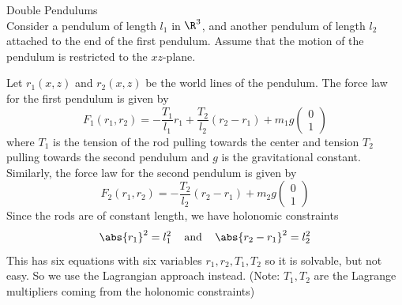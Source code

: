 \documentclass[a4paper]{article}
\begin{document}
\begin{eg}{Double Pendulums}{}\\
Consider a pendulum of length $l_1$ in $\R^3$, and another pendulum of length $l_2$ attached to the end of the first pendulum. Assume that the motion of the pendulum is restricted to the $xz$-plane. 

Let $r_1(x,z)$ and $r_2(x,z)$ be the world lines of the pendulum. The force law for the first pendulum is given by $$F_1(r_1,r_2)=-\frac{T_1}{l_1}r_1+\frac{T_2}{l_2}(r_2-r_1)+m_1g\begin{pmatrix}0\\1\end{pmatrix}$$ where $T_1$ is the tension of the rod pulling towards the center and tension $T_2$ pulling towards the second pendulum and $g$ is the gravitational constant. Similarly, the force law for the second pendulum is given by $$F_2(r_1,r_2)=-\frac{T_2}{l_2}(r_2-r_1)+m_2g\begin{pmatrix}0\\1\end{pmatrix}$$ Since the rods are of constant length, we have holonomic constraints $$\abs{r_1}^2=l_1^2\;\;\;\text{ and }\;\;\;\abs{r_2-r_1}^2=l_2^2$$ This has six equations with six variables $r_1,r_2,T_1,T_2$ so it is solvable, but not easy. So we use the Lagrangian approach instead. (Note: $T_1,T_2$ are the Lagrange multipliers coming from the holonomic constraints)\\


\end{eg}
\end{document}
